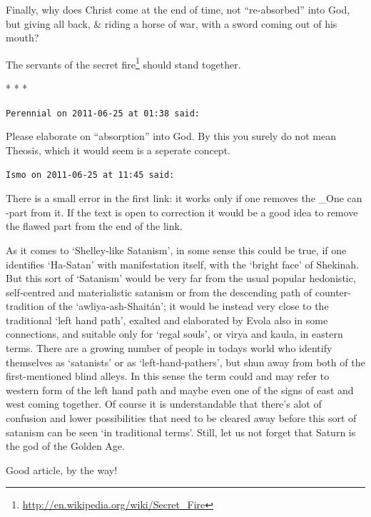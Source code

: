 Finally, why does Christ come at the end of time, not ``re-absorbed'' into God, but giving all back, \& riding a horse of war, with a sword coming out of his mouth?

The servants of the secret fire\footnote{\url{http://en.wikipedia.org/wiki/Secret\_Fire}} should stand together.



\begin{center}* * *\end{center}

\begin{footnotesize}
\begin{sffamily}
\texttt{Perennial on 2011-06-25 at 01:38 said:}

Please elaborate on ``absorption'' into God. By this you surely do not mean Theosis, which it would seem is a seperate concept.

\hfill

\texttt{Ismo on 2011-06-25 at 11:45 said:}

There is a small error in the first link: it works only if one removes the \_One can -part from it. If the text is open to correction it would be a good idea to remove the flawed part from the end of the link.

As it comes to `Shelley-like Satanism', in some sense this could be true, if one identifies `Ha-Satan' with manifestation itself, with the `bright face' of Shekinah. But this sort of `Satanism' would be very far from the usual popular hedonistic, self-centred and materialistic satanism or from the descending path of counter-tradition of the `awliya-ash-Shaitán'; it would be instead very close to the traditional `left hand path', exalted and elaborated by Evola also in some connections, and suitable only for `regal souls', or virya and kaula, in eastern terms. There are a growing number of people in todays world who identify themselves as `satanists' or as `left-hand-pathers', but shun away from both of the first-mentioned blind alleys. In this sense the term could and may refer to western form of the left hand path and maybe even one of the signs of east and west coming together. Of course it is understandable that there's alot of confusion and lower possibilities that need to be cleared away before this sort of satanism can be seen `in traditional terms'. Still, let us not forget that Saturn is the god of the Golden Age.

Good article, by the way!


\end{sffamily}
\end{footnotesize}
